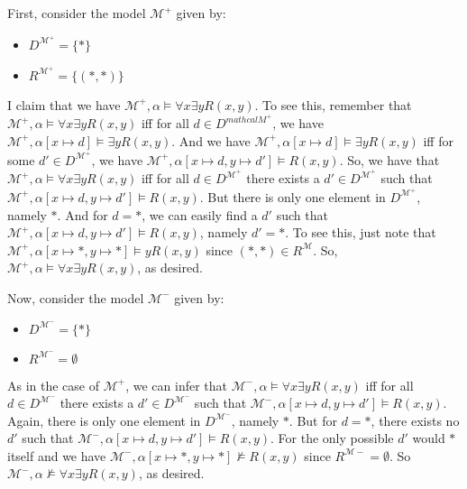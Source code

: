\begin{itemize}
                    First, consider the model $\mathcal{M}^+$ given by:
                    \begin{itemize}
                    \item $D^{\mathcal{M}^+}=\{\ast\}$
                    \item $R^{\mathcal{M}^+}=\{(\ast,\ast)\}$
                    \end{itemize}
                    I claim that we have $\mathcal{M}^+,\alpha\vDash
                    \forall x\exists yR(x,y)$. To see this, remember
                    that $\mathcal{M}^+,\alpha\vDash
                    \forall x\exists yR(x,y)$ iff for all
                    $d\in D^{mathcal{M}^+}$, we have
                    $\mathcal{M}^+,\alpha[x\mapsto d]\vDash
                    \exists yR(x,y)$. And we have $\mathcal{M}^+,\alpha[x\mapsto d]\vDash
                    \exists yR(x,y)$ iff for some $d'\in
                    D^{\mathcal{M}^+}$, we have
                    $\mathcal{M}^+,\alpha[x\mapsto d, y\mapsto d']\vDash
                    R(x,y)$. So, we have that $\mathcal{M}^+,\alpha\vDash
                    \forall x\exists yR(x,y)$ iff for all $d\in
                    D^{\mathcal{M}^+}$ there exists a $d'\in
                    D^{\mathcal{M}^+}$ such that  $\mathcal{M}^+,\alpha[x\mapsto d, y\mapsto d']\vDash
                    R(x,y)$. But there is only one element in
                    $D^{\mathcal{M}^+}$, namely $\ast$. And for
                    $d=\ast$, we can easily find a $d'$ such that $\mathcal{M}^+,\alpha[x\mapsto d, y\mapsto d']\vDash
                    R(x,y)$, namely $d'=\ast$. To see this, just note
                    that $\mathcal{M}^+,\alpha[x\mapsto \ast, y\mapsto \ast]\vDash
                    yR(x,y)$ since
                    $(\ast, \ast)\in R^\mathcal{M}$. So, $\mathcal{M}^+,\alpha\vDash
                    \forall x\exists yR(x,y)$, as desired.

                    Now, consider the model $\mathcal{M}^-$ given by:
                    \begin{itemize}
                    \item $D^{\mathcal{M}^-}=\{\ast\}$
                    \item $R^{\mathcal{M}^-}=\emptyset$
                    \end{itemize}
                   As in the case of $\mathcal{M}^+$, we can infer
                   that $\mathcal{M}^-,\alpha\vDash
                    \forall x\exists yR(x,y)$ iff for all $d\in
                    D^{\mathcal{M}^-}$ there exists a $d'\in
                    D^{\mathcal{M}^-}$ such that  $\mathcal{M}^-,\alpha[x\mapsto d, y\mapsto d']\vDash
                    R(x,y)$. Again, there is only one element in
                    $D^{\mathcal{M}^-}$, namely $\ast$. But for
                    $d=\ast$, there exists no $d'$ such that $\mathcal{M}^-,\alpha[x\mapsto d, y\mapsto d']\vDash
                    R(x,y)$. For the only possible $d'$ would $\ast$
                    itself and we have $\mathcal{M}^-,\alpha[x\mapsto \ast, y\mapsto \ast]\nvDash
                    R(x,y)$ since $R^{\mathcal{M}-}=\emptyset$. So  $\mathcal{M}^-,\alpha\nvDash
                    \forall x\exists yR(x,y)$, as desired.
                    

\end{itemize}
